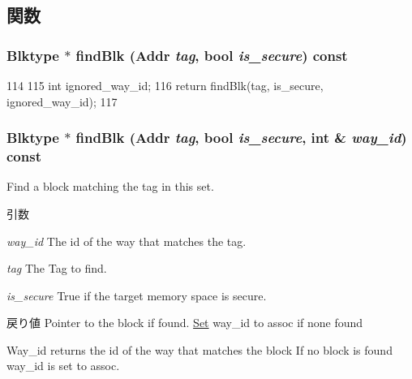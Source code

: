 \subsection{関数}
\hypertarget{classCacheSet_a393be734604995160749b784359a6ab0}{
\subsubsection[{findBlk}]{\setlength{\rightskip}{0pt plus 5cm}Blktype $\ast$ findBlk ({\bf Addr} {\em tag}, \/  bool {\em is\_\-secure}) const}}
\label{classCacheSet_a393be734604995160749b784359a6ab0}



\begin{DoxyCode}
114 {
115     int ignored_way_id;
116     return findBlk(tag, is_secure, ignored_way_id);
117 }
\end{DoxyCode}
\hypertarget{classCacheSet_a0536397551c228605cbb683c0d18971a}{
\subsubsection[{findBlk}]{\setlength{\rightskip}{0pt plus 5cm}Blktype $\ast$ findBlk ({\bf Addr} {\em tag}, \/  bool {\em is\_\-secure}, \/  int \& {\em way\_\-id}) const}}
\label{classCacheSet_a0536397551c228605cbb683c0d18971a}
Find a block matching the tag in this set. 
\begin{DoxyParams}{引数}
\item[{\em way\_\-id}]The id of the way that matches the tag. \item[{\em tag}]The Tag to find. \item[{\em is\_\-secure}]True if the target memory space is secure. \end{DoxyParams}
\begin{DoxyReturn}{戻り値}
Pointer to the block if found. \hyperlink{classSet}{Set} way\_\-id to assoc if none found 
\end{DoxyReturn}


Way\_\-id returns the id of the way that matches the block If no block is found way\_\-id is set to assoc.


